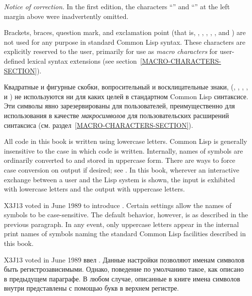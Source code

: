 
\begin{new}%
{\it Notice of correction.}
In the first edition, the characters ``\cd{,}'' and ``\cd{:}'' at the
left margin above were inadvertently omitted.
\end{new}

Brackets, braces, question mark, and exclamation point
(that is, \cd{{\Xlbracket}}, \cd{{\Xrbracket}}, \cd{{\Xlbrace}}, \cd{{\Xrbrace}},
, and \cd{!}) are not used for any purpose in standard Common Lisp syntax.
These characters are explicitly reserved to the user, primarily
for use as {\it macro characters} for user-defined lexical syntax extensions
(see section~\ref{MACRO-CHARACTERS-SECTION}).

Квадратные и фигурные скобки, вопросительный и восклицательные знаки, (\cd{{\Xlbracket}}, \cd{{\Xrbracket}}, \cd{{\Xlbrace}}, \cd{{\Xrbrace}},
 и  \cd{!}) не используются ни для каких целей в стандартном Common Lisp
синтаксисе. Эти символы явно зарезервированы для пользователей, преимущественно
для использования в качестве {\it макросимволов} для пользовательских расширений
синтаксиса (см. раздел~\ref{MACRO-CHARACTERS-SECTION}).

\begin{obsolete}
All code in this book is written using lowercase letters.
Common Lisp is generally insensitive to the case in which code
is written.  Internally, names of symbols are ordinarily
converted to and stored in uppercase form.
There are ways to force case conversion on output if desired;
see .
In this book, wherever an interactive exchange between a user
and the Lisp system is shown, the input is exhibited with lowercase
letters and the output with uppercase letters.
\end{obsolete}

\begin{newer}
X3J13 voted in June 1989  to introduce
.  Certain settings allow the names of symbols
to be case-sensitive.  The default behavior, however, is as described
in the previous paragraph.  In any event, only uppercase letters
appear in the internal print names of symbols naming the
standard Common Lisp facilities described in this book.

X3J13 voted in June 1989 
ввел . Данные настройки позволяют именам символов быть
регистрозависимыми. Однако, поведение по умолчанию такое, как описано в
предыдущем параграфе. В любом случае, описанные в книге имена символов внутри
представлены с помощью букв в верхнем регистре.
\end{newer}
